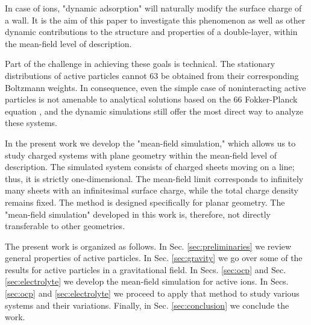 \documentclass[pre,twocolumn,graphicx]{revtex4-1}
\begin{document}
In case of ions, "dynamic adsorption" will naturally modify the surface charge of a wall. It is the aim of 
this paper to investigate this phenomenon as well as other dynamic contributions to the structure and 
properties of a double-layer, within the mean-field level of description.

Part of the challenge in achieving these goals is technical. The stationary distributions of 
active particles cannot 63 be obtained from their corresponding Boltzmann weights. 
In consequence, even the simple case of noninteracting active particles is not amenable to analytical 
solutions based on the 66 Fokker-Planck equation \cite{Fisch80,Cates15c,Wagner17}, 
and the dynamic simulations still offer the most direct way to analyze these systems.  

In the present work we develop the "mean-field simulation," which allows us to study charged systems 
with plane geometry within the mean-field level of description. The simulated system consists of charged 
sheets moving on a line;  thus, it is strictly one-dimensional. The mean-field limit corresponds to infinitely 
many sheets with an infinitesimal surface charge, while the total charge density remains fixed. The method 
is designed specifically for planar geometry. The "mean-field simulation" developed in this work is, therefore,
not directly transferable to other geometries.


The present work is organized as follows. In Sec. \ref{sec:preliminaries} we review general properties of 
active particles. In Sec. \ref{sec:gravity} we go over some of the results for active particles in a gravitational field. 
In Secs. \ref{sec:ocp} and Sec. \ref{sec:electrolyte} we develop the mean-field simulation for active ions. 
In Secs. \ref{sec:ocp} and \ref{sec:electrolyte} we proceed to apply that method to study various systems and 
their variations. Finally, in Sec. \ref{sec:conclusion} we conclude the work.


\end{document}
